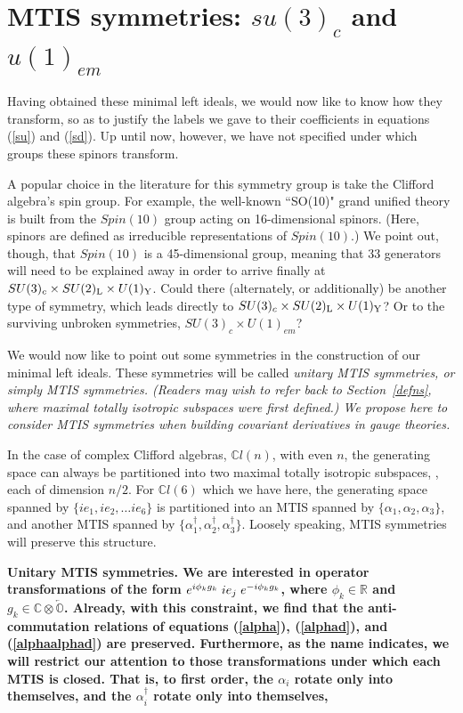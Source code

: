 \documentclass[letterpaper,12pt,titlepage,oneside,final]{book}
\newcommand{\COOO}{\mathbb{C}\otimes\overleftarrow{\mathbb{O}}}
\newcommand{\CLsix}{\mathbb{C}l(6)}
\newcommand{\CLn}{\mathbb{C}l(n)}
\begin{document}
\section{MTIS symmetries:  $su(3)_c$ and $u(1)_{em}$\label{MTIS}  }

Having obtained these minimal left ideals, we would now like to know how they transform, so as to justify the labels we gave to their coefficients in equations (\ref{su}) and (\ref{sd}).  Up until now, however, we have not specified under which groups these spinors transform.

A popular choice in the literature for this symmetry group is take the Clifford algebra's spin group.  For example, the well-known ``SO(10)" grand unified theory is built from the $Spin(10)$ group acting on 16-dimensional spinors.  (Here, spinors are defined as irreducible representations of $Spin(10)$.)  We point out, though, that $Spin(10)$ is a 45-dimensional group, meaning that 33 generators will need to be explained away in order to arrive finally at $SU(3)_c\times SU(2)_{\textup{L}} \times U(1)_{\textup{Y}}$.  Could there (alternately, or additionally) be another type of symmetry, which leads directly to $SU(3)_c\times SU(2)_{\textup{L}} \times U(1)_{\textup{Y}}$?  Or to the surviving  unbroken symmetries, $SU(3)_c\times U(1)_{em}$?

We would now like to point out some symmetries in the construction of our minimal left ideals.  These symmetries will be called \it unitary MTIS symmetries, \rm or simply \it MTIS symmetries. \rm  (Readers may wish to refer back to Section~\ref{defns}, where maximal totally isotropic subspaces were first defined.)  We propose here to consider MTIS symmetries  when building  covariant derivatives in gauge theories. 

In the case of complex Clifford algebras, $\CLn$, with even $n$, the generating space can always be partitioned into two maximal totally isotropic subspaces, \cite{ablam}, each of dimension $n/2$.  For $\CLsix$ which we have here, the generating space spanned by $\{ie_1, ie_2, \dots ie_6\}$ is partitioned into an MTIS spanned by $\{\alpha_1, \alpha_2, \alpha_3 \}$, and another MTIS spanned by $\{\alpha_1^{\dagger}, \alpha_2^{\dagger}, \alpha_3 ^{\dagger}\}$.  Loosely speaking, MTIS symmetries will preserve this structure.

\bf Unitary MTIS symmetries. \rm  We are interested in operator transformations of the form $e^{i\phi_k g_k}
\hspace{1mm}ie_j \hspace{1mm}e^{-i\phi_k g_k}$, where $\phi_k\in\mathbb{R}$ and $g_k\in\COOO$.  Already, with this constraint, we find that the anti-commutation relations of equations (\ref{alpha}), (\ref{alphad}), and (\ref{alphaalphad}) are preserved.  Furthermore, as the name indicates, we will restrict our attention to those transformations under which each MTIS is closed.   That is, to first order, the $\alpha_i$ rotate only into themselves, and the $\alpha_i^{\dagger}$ rotate only into themselves, 
\end{document}
